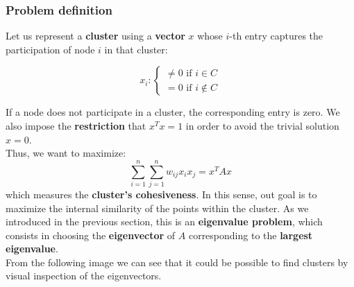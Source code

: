 \subsubsection{Problem definition}
Let us represent a \textbf{cluster} using a \textbf{vector} $x$ whose $i$-th entry captures the participation of node $i$ in that cluster:

$$x_i : \begin{cases}
\neq 0 \text{  if } i \in C\\
= 0 \text{  if } i \notin C
\end{cases}$$

If a node does not participate in a cluster, the corresponding entry is zero. We also impose the \textbf{restriction} that $x^Tx = 1$ in order to avoid the trivial solution $x=0$.\\
Thus, we want to maximize:
$$\sum_{i=1}^n \sum_{j=1}^n w_{ij} x_i x_j = x^TAx$$
which measures the \textbf{cluster's cohesiveness}. In this sense, out goal is to maximize the internal similarity of the points within the cluster. As we introduced in the previous section, this is an \textbf{eigenvalue problem}, which consists in choosing the \textbf{eigenvector} of $A$ corresponding to the \textbf{largest eigenvalue}.\\

From the following image we can see that it could be possible to find clusters by visual inspection of the eigenvectors.


